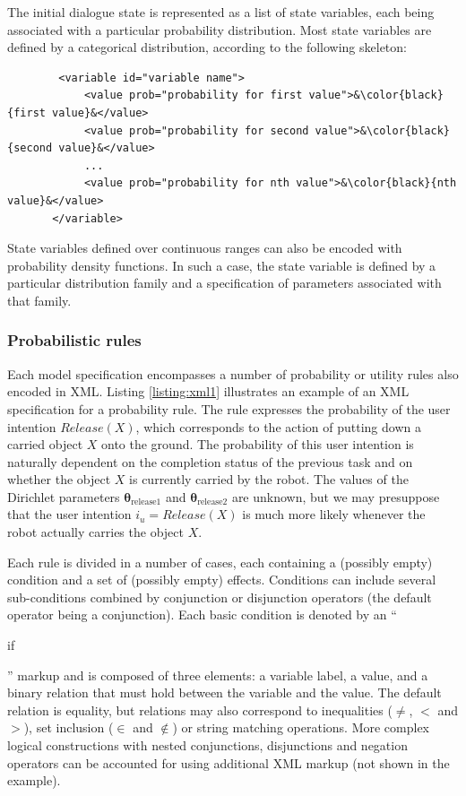 The initial dialogue state is represented as a list of state variables, each being associated with a particular probability distribution.  Most state variables are defined by a categorical distribution, according to the following skeleton:

\vspace{3mm}\begin{lstlisting}
        <variable id="variable name">
            <value prob="probability for first value">&\color{black}{first value}&</value>
            <value prob="probability for second value">&\color{black}{second value}&</value>
            ...
            <value prob="probability for nth value">&\color{black}{nth value}&</value>
       </variable>  
\end{lstlisting}\vspace{2mm}

State variables defined over continuous ranges can also be encoded with probability density functions. In such a case, the state variable is defined by a particular distribution family and a specification of parameters associated with that family. 

\subsubsection*{Probabilistic rules}

Each model specification encompasses a number of probability or utility rules also encoded in XML. Listing \ref{listing:xml1} illustrates an example of an XML specification for a probability rule. The rule expresses the probability of the user intention $\mathit{Release}(X)$, which corresponds to the action of putting down a carried object $X$ onto the ground.  The probability of this user intention is naturally dependent on the completion status of the previous task and on whether the object $X$ is currently carried by the robot. The values of the Dirichlet parameters $\boldsymbol\theta_{\text{release1}}$ and $\boldsymbol\theta_{\text{release2}}$ are unknown, but we may presuppose that the user intention $i_u = \mathit{Release}(X)$ is much more likely whenever the robot actually carries the object $X$. 

Each rule is divided in a number of cases, each containing a (possibly empty) condition and a set of (possibly empty) effects.  Conditions can include several sub-conditions combined by conjunction or disjunction operators (the default operator being a conjunction). Each basic condition is denoted by an ``\begin{small}\textsf{if}\end{small}'' markup and is composed of three elements: a variable label, a value, and a binary relation that must hold between the variable and the value. The default relation is equality, but relations may also correspond to inequalities ($\neq$, $<$ and $>$), set inclusion ($\in$ and $\notin$) or string matching operations.   More complex logical constructions with nested conjunctions, disjunctions and negation operators can be accounted for using additional XML markup (not shown in the example). 

